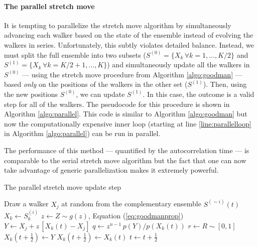 \documentclass[12pt,preprint]{aastex}
\newcommand{\Eq}[1]{Equation (\ref{eq:#1})}
\newcommand{\eq}[1]{Equation (\ref{eq:#1})}
\newcommand{\algo}[1]{Algorithm \ref{algo:#1}}
\newcommand{\algolabel}[1]{\label{algo:#1}}
\newcommand{\ensemble}{S}
\newcommand{\colorens}[1]{\ensemble^{(#1)}}
\newcommand{\red}{\colorens{0}}
\newcommand{\blue}{\colorens{1}}
\renewcommand{\vector}[1]{#1}
\begin{document}
\numberparagraphs

\paragraph{The parallel stretch move}

It is tempting to parallelize the stretch move algorithm by
simultaneously advancing each walker based on the state of the ensemble
instead of evolving the walkers in series. Unfortunately, this subtly
violates detailed balance. Instead, we must split the full ensemble
into two subsets
($\red = \{ \vector{X_k} \, \forall k = 1, \ldots, K/2 \}$ and
$\blue = \{ \vector{X_k} \, \forall k = K/2+1, \ldots, K \}$) and
simultaneously update all the walkers in $\red$
--- using the stretch move procedure from \algo{goodman} ---
based \emph{only} on the positions of the walkers in the other set
($\blue$). Then, using the new positions $\red$,
we can update $\blue$. In this case, the outcome is a valid step
for all of the walkers. The pseudocode for
this procedure is shown in \algo{parallel}. This code is similar to
\algo{goodman} but now the computationally expensive inner loop
(starting at line \ref{line:parallelloop} in \algo{parallel}) can be run in
parallel.

The performance of this method --- quantified by the autocorrelation time ---
is comparable to the serial stretch move algorithm but the fact that one
can now take advantage of generic parallelization makes it
extremely powerful.

\nonumberparagraphs

\begin{algorithm}
\caption{The parallel stretch move update step
    \algolabel{parallel}}
\begin{algorithmic}[1]
     \label{line:parallelloop}
        \STATE Draw a walker $\vector{X_j}$ at random from the complementary %
            ensemble $\colorens{\sim i} (t)$
        \STATE $\vector{X_k} \gets \colorens{i}_k$
        \STATE $z \gets Z \sim g(z)$, \Eq{goodmanprop}
        \STATE $\vector{Y} \gets \vector{X_j}
                + z \, [ \vector{X_k} (t) - \vector{X_j}]$
        \STATE $q \gets z^{n-1} \, p(\vector{Y})/p(\vector{X}_k(t))$
        \STATE $r \gets R \sim [0, 1]$
        \IF{$r \ge q$, \eq{acceptance}}
            \STATE $\vector{X_k} (t+\frac{1}{2}) \gets \vector{Y}$
        \ELSE
            \STATE $\vector{X_k} (t+\frac{1}{2}) \gets \vector{X_k}(t)$
        \ENDIF
    \ENDFOR
    \STATE $t \gets t+\frac{1}{2}$
\ENDFOR

\numberparagraphs

\end{algorithmic}
\end{algorithm}
\end{document}
